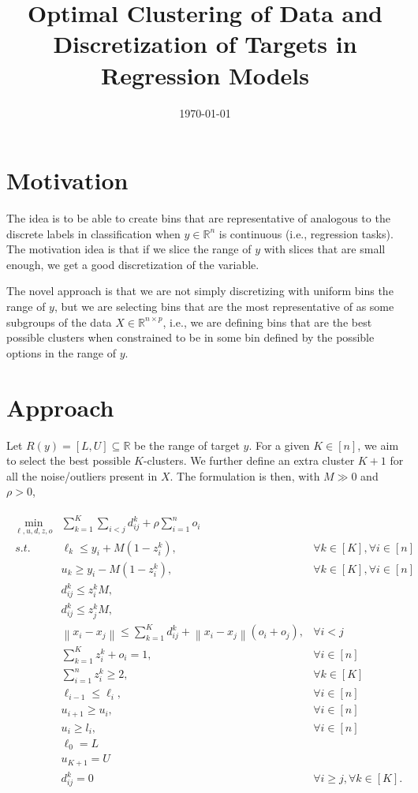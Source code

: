 \documentclass[11pt]{article}
\title{Optimal Clustering of Data and Discretization of Targets in Regression Models}
\date{\today}
\theoremstyle{plain}
\theoremstyle{definition}
\newcommand{\R}{\mathbb{R}}
\newcommand{\norm}[1]{\left\lVert #1 \right\rVert}
\newcommand{\1}{\mathbf{1}}
\renewcommand{\R}{\mathbb{R}}
\begin{document}
\maketitle

\section{Motivation}

The idea is to be able to create bins that are representative of analogous to the discrete labels in classification when $y \in \R^n$ is continuous (i.e., regression tasks). The motivation idea is that if we slice the range of $y$ with slices that are small enough, we get a good discretization of the variable. 

The novel approach is that we are not simply discretizing with uniform bins the range of $y$, but we are selecting bins that are the most representative of as some subgroups of the data $X\in\R^{n\times p}$, i.e., we are defining bins that are the best possible clusters when constrained to be in some bin defined by the possible options in the range of $y$. 

\section{Approach}

Let $R(y)=[L, U] \subseteq \R$ be the range of target $y$. For a given $K\in [n]$, we aim to select the best possible $K$-clusters. We further define an extra cluster $K+1$ for all the noise/outliers present in $X$. The formulation is then, with $M\gg0$ and $\rho >0$, 

{\everymath{\displaystyle}
\begin{align*}
    \begin{array}{rll}
 \min_{\ell, u, d, z, o} & \sum_{k=1}^K \sum_{i<j} d_{ij}^k + \rho \sum_{i=1}^n o_i\\
   s.t. & \ell_k \leq y_i + M(1-z_{i}^k),& \forall k \in [K], \forall i \in [n]\\
   & u_k \geq y_i - M(1-z_{i}^k),& \forall k \in [K], \forall i \in [n] \\
    & d_{ij}^k \leq z_i^k M,\\
    & d_{ij}^k \leq z_j^k M, \\
    & \norm{x_i - x_j} \leq \sum_{k=1}^K d_{ij}^k + \norm{x_i - x_j}  (o_i + o_j), & \forall i<j\\
    & \sum_{k=1}^{K} z_{i}^k + o_i = 1,& \forall i \in [n]\\
    &  \sum_{i=1}^{n} z_{i}^k \geq 2,& \forall k \in [K]\\
    & \ell_{i-1} \leq \ell_{i}, & \forall i \in [n] \\
    & u_{i+1} \geq u_{i}, & \forall i \in [n] \\
    & u_{i} \geq l_{i}, & \forall i \in [n] \\
    & \ell_0 = L\\
    & u_{K+1} = U\\
    & d_{ij}^k=0 & \forall i\geq j, \forall k \in [K].
    \end{array}
\end{align*}
}
\end{document}
